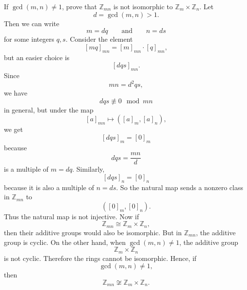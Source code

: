 \begin{problem}{
    If $\gcd(m,n)\neq 1$, prove that $\mathbb{Z}_{mn}$ is not isomorphic to $\mathbb{Z}_m\times\mathbb{Z}_n$.
}
    Let
    \[
        d=\gcd(m,n)>1.
    \]
    Then we can write
    \[
        m=dq
        \qquad\text{and}\qquad
        n=ds
    \]
    for some integers $q,s$.
    Consider the element
    \[
        [mq]_{mn}=[m]_{mn}\cdot [q]_{mn},
    \]
    but an easier choice is
    \[
        [dqs]_{mn}.
    \]
    Since
    \[
        mn=d^{2}qs,
    \]
    we have
    \[
        dqs\not\equiv 0\mod {mn}
    \]
    in general, but under the map
    \[
        [a]_{mn}\mapsto ([a]_m,[a]_n),
    \]
    we get
    \[
        [dqs]_m=[0]_m
    \]
    because
    \[
        dqs=\frac{mn}{d}
    \]
    is a multiple of $m=dq$.
    Similarly,
    \[
        [dqs]_n=[0]_n
    \]
    because it is also a multiple of $n=ds$.
    So the natural map sends a nonzero class in $\mathbb{Z}_{mn}$ to
    \[
        ([0]_m,[0]_n).
    \]
    Thus the natural map is not injective.
    Now if
    \[
        \mathbb{Z}_{mn}\cong \mathbb{Z}_m\times\mathbb{Z}_n,
    \]
    then their additive groups would also be isomorphic.
    But in $\mathbb{Z}_{mn}$, the additive group is cyclic.
    On the other hand, when $\gcd(m,n)\neq 1$, the additive group
    \[
        \mathbb{Z}_m\times\mathbb{Z}_n
    \]
    is not cyclic.
    Therefore the rings cannot be isomorphic.
    Hence, if
    \[
        \gcd(m,n)\neq 1,
    \]
    then
    \[
        \mathbb{Z}_{mn}\not\cong \mathbb{Z}_m\times\mathbb{Z}_n.
    \]
\end{problem}